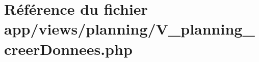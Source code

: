 \hypertarget{_v__planning__creer_donnees_8php}{}\section{Référence du fichier app/views/planning/\+V\+\_\+planning\+\_\+creer\+Donnees.php}
\label{_v__planning__creer_donnees_8php}
